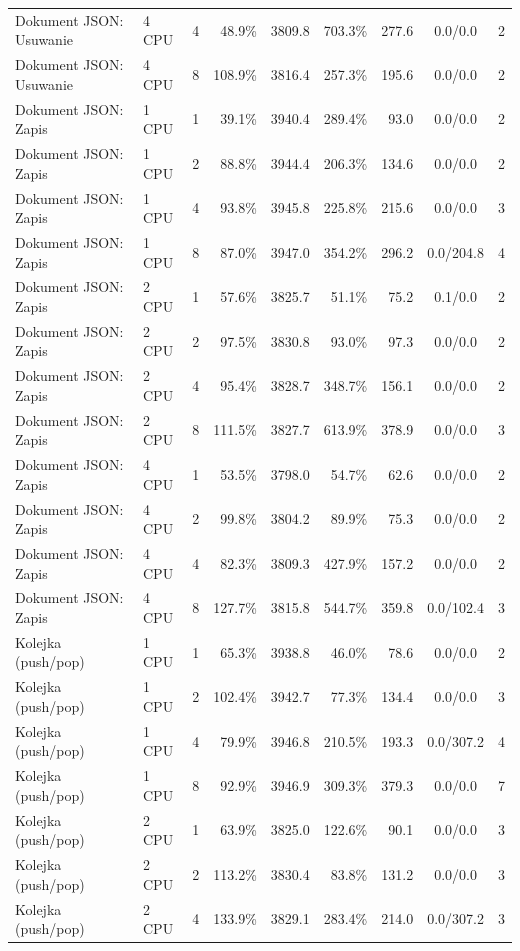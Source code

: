 \begin{table}[ht]
{\begin{tabular}{llcrrrrcc}
Dokument JSON: Usuwanie & 4 CPU & 4 & 48.9\% & 3809.8 & 703.3\% & 277.6 & 0.0/0.0 & 2 \\
Dokument JSON: Usuwanie & 4 CPU & 8 & 108.9\% & 3816.4 & 257.3\% & 195.6 & 0.0/0.0 & 2 \\
Dokument JSON: Zapis & 1 CPU & 1 & 39.1\% & 3940.4 & 289.4\% & 93.0 & 0.0/0.0 & 2 \\
Dokument JSON: Zapis & 1 CPU & 2 & 88.8\% & 3944.4 & 206.3\% & 134.6 & 0.0/0.0 & 2 \\
Dokument JSON: Zapis & 1 CPU & 4 & 93.8\% & 3945.8 & 225.8\% & 215.6 & 0.0/0.0 & 3 \\
Dokument JSON: Zapis & 1 CPU & 8 & 87.0\% & 3947.0 & 354.2\% & 296.2 & 0.0/204.8 & 4 \\
Dokument JSON: Zapis & 2 CPU & 1 & 57.6\% & 3825.7 & 51.1\% & 75.2 & 0.1/0.0 & 2 \\
Dokument JSON: Zapis & 2 CPU & 2 & 97.5\% & 3830.8 & 93.0\% & 97.3 & 0.0/0.0 & 2 \\
Dokument JSON: Zapis & 2 CPU & 4 & 95.4\% & 3828.7 & 348.7\% & 156.1 & 0.0/0.0 & 2 \\
Dokument JSON: Zapis & 2 CPU & 8 & 111.5\% & 3827.7 & 613.9\% & 378.9 & 0.0/0.0 & 3 \\
Dokument JSON: Zapis & 4 CPU & 1 & 53.5\% & 3798.0 & 54.7\% & 62.6 & 0.0/0.0 & 2 \\
Dokument JSON: Zapis & 4 CPU & 2 & 99.8\% & 3804.2 & 89.9\% & 75.3 & 0.0/0.0 & 2 \\
Dokument JSON: Zapis & 4 CPU & 4 & 82.3\% & 3809.3 & 427.9\% & 157.2 & 0.0/0.0 & 2 \\
Dokument JSON: Zapis & 4 CPU & 8 & 127.7\% & 3815.8 & 544.7\% & 359.8 & 0.0/102.4 & 3 \\
Kolejka (push/pop) & 1 CPU & 1 & 65.3\% & 3938.8 & 46.0\% & 78.6 & 0.0/0.0 & 2 \\
Kolejka (push/pop) & 1 CPU & 2 & 102.4\% & 3942.7 & 77.3\% & 134.4 & 0.0/0.0 & 3 \\
Kolejka (push/pop) & 1 CPU & 4 & 79.9\% & 3946.8 & 210.5\% & 193.3 & 0.0/307.2 & 4 \\
Kolejka (push/pop) & 1 CPU & 8 & 92.9\% & 3946.9 & 309.3\% & 379.3 & 0.0/0.0 & 7 \\
Kolejka (push/pop) & 2 CPU & 1 & 63.9\% & 3825.0 & 122.6\% & 90.1 & 0.0/0.0 & 3 \\
Kolejka (push/pop) & 2 CPU & 2 & 113.2\% & 3830.4 & 83.8\% & 131.2 & 0.0/0.0 & 3 \\
Kolejka (push/pop) & 2 CPU & 4 & 133.9\% & 3829.1 & 283.4\% & 214.0 & 0.0/307.2 & 3 \\

\end{tabular}}
\end{table}
